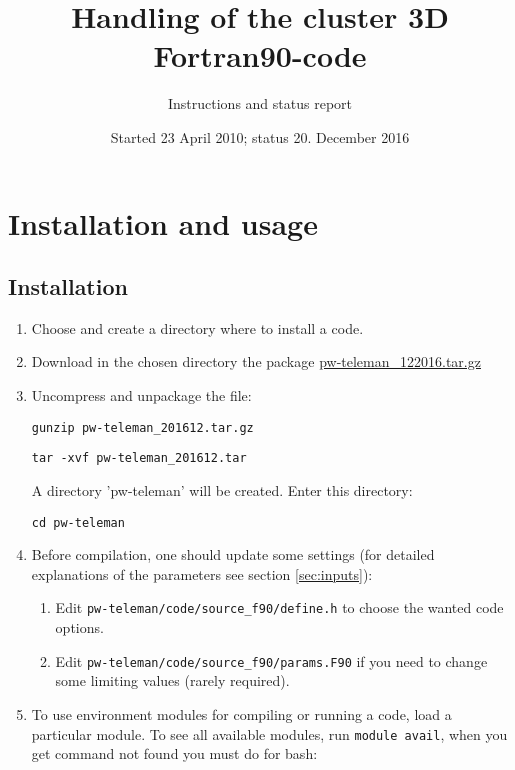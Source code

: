 \documentclass[12pt]{article}
\begin{document}
\title{Handling of the cluster 3D Fortran90-code}
\author{Instructions and status report}
\date{Started 23 April 2010; status 20. December 2016}
\maketitle

\tableofcontents
\newpage

\section{Installation and usage}
\pagestyle{headings}
\subsection{Installation}

\begin{enumerate}
\item Choose and create a directory where to install a code.
\item Download in the chosen directory the package \href{http://redmine.pw-teleman.org/projects/pw-teleman/files}{pw-teleman\_122016.tar.gz}  
\item Uncompress and unpackage the file:

\hspace*{1cm}
{\tt gunzip pw-teleman\_201612.tar.gz}

\hspace*{1cm}
{\tt tar -xvf pw-teleman\_201612.tar}

A directory 'pw-teleman' will be created. Enter this directory:

\hspace*{1cm}
{\tt cd pw-teleman}


\item Before compilation, one should update some settings
(for detailed explanations of the parameters see section \ref{sec:inputs}):
\begin{enumerate}
\item
 Edit {\tt pw-teleman/code/source\_f90/define.h} to choose the wanted code options.
\item
 Edit {\tt pw-teleman/code/source\_f90/params.F90} if you need to change some limiting values
 (rarely required).
\end{enumerate}

\item To use environment modules for compiling or running a code, load a particular module. To see all available modules, run {\tt module avail}, when you get command not found you must do for bash:


\end{enumerate}
\end{document}

